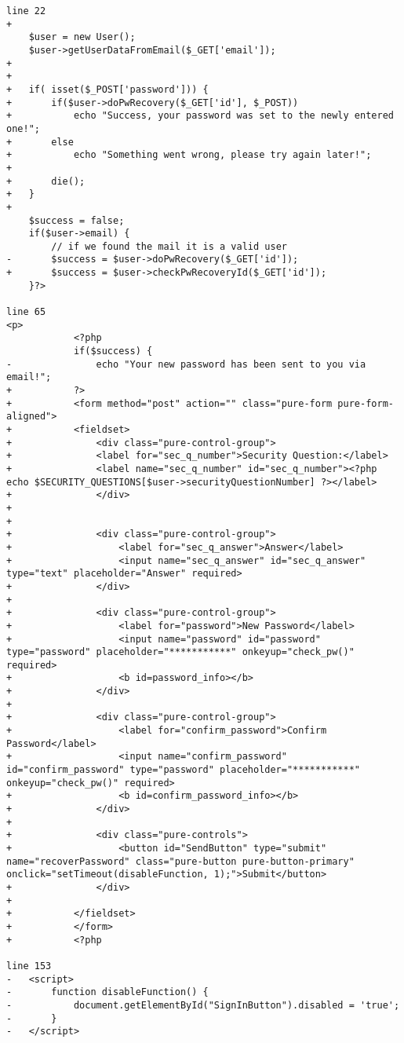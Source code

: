 \begin{lstlisting}[caption = pw\_recovery.php]
line 22
+	
 	$user = new User();
 	$user->getUserDataFromEmail($_GET['email']);
+	
+	
+	if( isset($_POST['password'])) {
+		if($user->doPwRecovery($_GET['id'], $_POST))
+			echo "Success, your password was set to the newly entered one!";
+		else
+			echo "Something went wrong, please try again later!";
+			
+		die();
+	}
+	
 	$success = false;
 	if($user->email) {
 		// if we found the mail it is a valid user
-		$success = $user->doPwRecovery($_GET['id']);
+		$success = $user->checkPwRecoveryId($_GET['id']);
 	}?>
 	
line 65
<p>
 			<?php 
 			if($success) {
-				echo "Your new password has been sent to you via email!";
+			?>
+			<form method="post" action="" class="pure-form pure-form-aligned">
+		    <fieldset>
+				<div class="pure-control-group">
+				<label for="sec_q_number">Security Question:</label>
+		        <label name="sec_q_number" id="sec_q_number"><?php echo $SECURITY_QUESTIONS[$user->securityQuestionNumber] ?></label>
+		        </div> 
+		        
+		        
+		        <div class="pure-control-group">
+		            <label for="sec_q_answer">Answer</label>
+		            <input name="sec_q_answer" id="sec_q_answer" type="text" placeholder="Answer" required>
+		        </div>
+		        
+		        <div class="pure-control-group">
+		            <label for="password">New Password</label>
+		            <input name="password" id="password" type="password" placeholder="***********" onkeyup="check_pw()" required>
+		            <b id=password_info></b>
+		        </div>
+		        
+		        <div class="pure-control-group">
+		            <label for="confirm_password">Confirm Password</label>
+		            <input name="confirm_password" id="confirm_password" type="password" placeholder="***********" onkeyup="check_pw()" required>
+		            <b id=confirm_password_info></b>
+		        </div>
+		        
+		        <div class="pure-controls">
+		            <button id="SendButton" type="submit" name="recoverPassword" class="pure-button pure-button-primary" onclick="setTimeout(disableFunction, 1);">Submit</button>
+		        </div>
+		        
+		    </fieldset>
+			</form>
+			<?php 

line 153
-	<script>
-		function disableFunction() {
-		    document.getElementById("SignInButton").disabled = 'true';
-		}
-	</script>


\end{lstlisting}
